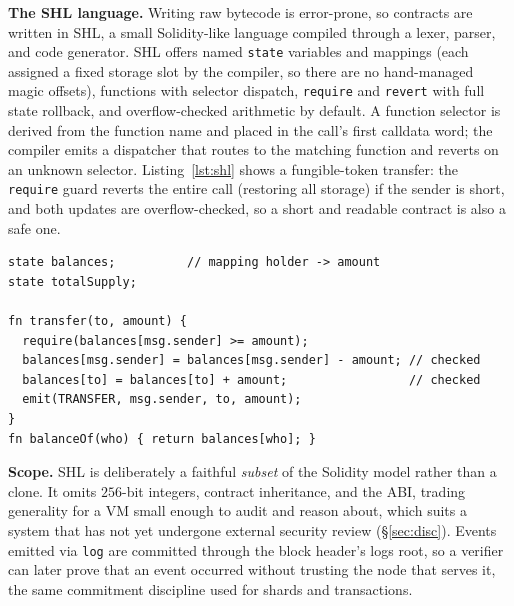 \textbf{The SHL language.} Writing raw bytecode is error-prone, so contracts are written in SHL, a
small Solidity-like language compiled through a lexer, parser, and code generator. SHL offers named
\texttt{state} variables and mappings (each assigned a fixed storage slot by the compiler, so there
are no hand-managed magic offsets), functions with selector dispatch, \texttt{require} and
\texttt{revert} with full state rollback, and overflow-checked arithmetic by default. A function
selector is derived from the function name and placed in the call's first calldata word; the
compiler emits a dispatcher that routes to the matching function and reverts on an unknown selector.
Listing~\ref{lst:shl} shows a fungible-token transfer: the \texttt{require} guard reverts the entire
call (restoring all storage) if the sender is short, and both updates are overflow-checked, so a
short and readable contract is also a safe one.

\begin{lstlisting}[caption={A safe ERC-20-style transfer in SHL.},label={lst:shl}]
state balances;          // mapping holder -> amount
state totalSupply;

fn transfer(to, amount) {
  require(balances[msg.sender] >= amount);
  balances[msg.sender] = balances[msg.sender] - amount; // checked
  balances[to] = balances[to] + amount;                 // checked
  emit(TRANSFER, msg.sender, to, amount);
}
fn balanceOf(who) { return balances[who]; }
\end{lstlisting}

\textbf{Scope.} SHL is deliberately a faithful \emph{subset} of the Solidity model rather than a
clone. It omits $256$-bit integers, contract inheritance, and the ABI, trading generality for a VM
small enough to audit and reason about, which suits a system that has not yet undergone external
security review (\S\ref{sec:disc}). Events emitted via \texttt{log} are committed through the block
header's logs root, so a verifier can later prove that an event occurred without trusting the node
that serves it, the same commitment discipline used for shards and transactions.
